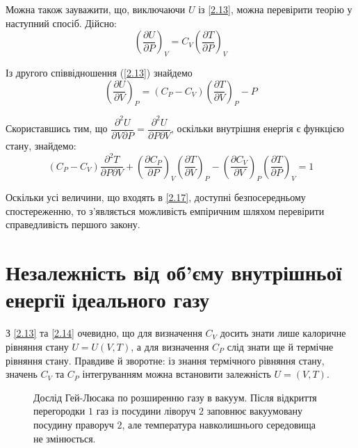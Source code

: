 Можна також зауважити, що, виключаючи $U$ із \eqref{2.13}, можна перевірити теорію у наступний
спосіб. Дійсно:
\begin{equation}\label{2.15}
	\left(\dfrac{\partial U}{\partial P}\right)_V =C_V\left(\dfrac{\partial T}{\partial P}\right)_V
\end{equation}

Із другого співвідношення (\ref{2.13}) знайдемо
\begin{equation}\label{2.16}
	\left(\dfrac{\partial U}{\partial V}\right)_{P} = (C_P - C_V)\left(\dfrac{\partial T}{\partial
V}\right)_P -P
\end{equation}

Скориставшись тим, що $\dfrac{\partial^2 U}{\partial V\partial P} = \dfrac{\partial^2 U}{\partial P
\partial V}$, оскільки внутрішня енергія є функцією стану, знайдемо:
\begin{equation}\label{2.17}
	(C_P-C_V) \dfrac{\partial^2 T }{\partial P\partial V}+\left(\dfrac{\partial C_P }{\partial
P}\right)_V\left(\dfrac{\partial T}{\partial V}\right)_P - \left(\dfrac{\partial C_V}{\partial
V}\right)_P\left(\dfrac{\partial T}{\partial P}\right)_V=1
\end{equation}

Оскільки усі величини, що входять в \eqref{2.17}, доступні безпосередньому спостереженню, то
з'являється можливість емпіричним шляхом перевірити справедливість першого закону.

\section{Незалежність від об'єму внутрішньої енергії ідеального газу}

З \eqref{2.13} та \eqref{2.14} очевидно, що для визначення $C_V$ досить знати лише калоричне рівняння
стану $U = U(V,T)$, а для визначення $C_P$ слід знати ще й термічне рівняння стану. Правдиве й
зворотне: із знання термічного рівняння стану, значень $C_V$ та $C_P$ інтегруванням можна встановити
залежність $U = (V,T)$.

\begin{figure}[h!]\centering
	
	\caption{Дослід Гей-Люсака по розширенню газу в вакуум. Після відкриття перегородки $1$ газ із
	посудини ліворуч $2$ заповнює вакуумовану посудину праворуч $2$, але температура навколишнього
	середовища
	не
	змінюється.}
	\label{pic:Pic2.4}
\end{figure}

